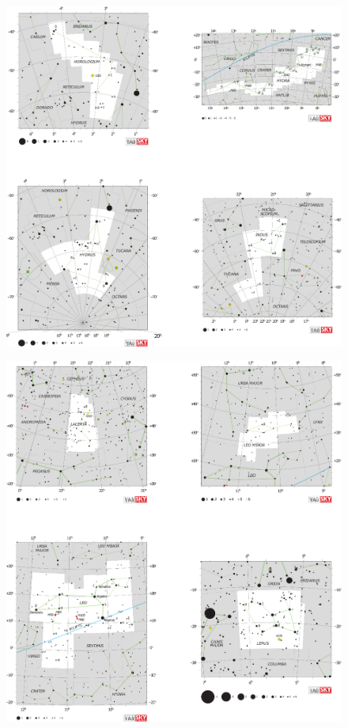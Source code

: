 \documentclass[a4paper,12pt]{extarticle}
\begin{document}
\clearpage
\begin{figure}
	\centering
	\includegraphics[width=\linewidth]{C11.eps}
\end{figure}
\clearpage
\begin{figure}
	\centering
	\includegraphics[width=\linewidth]{C12.eps}
\end{figure}
\end{document}

